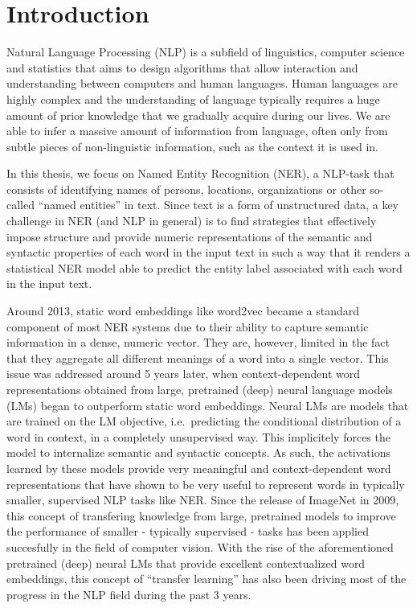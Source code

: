 \documentclass[12pt,a4paper,]{book}
\begin{document}
\mainmatter

\hypertarget{introduction}{%
\chapter{Introduction}\label{introduction}}

Natural Language Processing (NLP) is a subfield of linguistics, computer science and statistics that aims to design algorithms that allow interaction and understanding between computers and human languages. Human languages are highly complex and the understanding of language typically requires a huge amount of prior knowledge that we gradually acquire during our lives. We are able to infer a massive amount of information from language, often only from subtle pieces of non-linguistic information, such as the context it is used in.

In this thesis, we focus on Named Entity Recognition (NER), a NLP-task that consists of identifying names of persons, locations, organizations or other so-called ``named entities'' in text. Since text is a form of unstructured data, a key challenge in NER (and NLP in general) is to find strategies that effectively impose structure and provide numeric representations of the semantic and syntactic properties of each word in the input text in such a way that it renders a statistical NER model able to predict the entity label associated with each word in the input text.

Around 2013, static word embeddings like word2vec \citep{mikolov2013} became a standard component of most NER systems due to their ability to capture semantic information in a dense, numeric vector. They are, however, limited in the fact that they aggregate all different meanings of a word into a single vector. This issue was addressed around 5 years later, when context-dependent word representations obtained from large, pretrained (deep) neural language models (LMs) began to outperform static word embeddings. Neural LMs are models that are trained on the LM objective, i.e.~predicting the conditional distribution of a word in context, in a completely unsupervised way. This implicitely forces the model to internalize semantic and syntactic concepts. As such, the activations learned by these models provide very meaningful and context-dependent word representations that have shown to be very useful to represent words in typically smaller, supervised NLP tasks like NER. Since the release of ImageNet \citep{deng2009} in 2009, this concept of transfering knowledge from large, pretrained models to improve the performance of smaller - typically supervised - tasks has been applied succesfully in the field of computer vision. With the rise of the aforementioned pretrained (deep) neural LMs that provide excellent contextualized word embeddings, this concept of ``transfer learning'' has also been driving most of the progress in the NLP field during the past 3 years.
\end{document}
